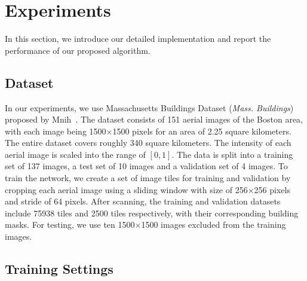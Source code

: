 
\section{Experiments}
\label{section:experiments}
In this section, we introduce our detailed implementation and report the performance of our proposed algorithm.

\subsection{Dataset}
  
In our experiments, we use Massachusetts Buildings Dataset (\textit{Mass. Buildings}) proposed by Mnih~\cite{Mnih2013Machine}.
The dataset consists of 151 aerial images of the Boston area, with each image being 1500$\times$1500 pixels for an area of 2.25 square kilometers. 
The entire dataset covers roughly 340 square kilometers. 
The intensity of each aerial image is scaled into the range of $[0,1]$.
%
The data is split into a training set of 137 images, a test set of 10 images and a validation set of 4 images. 
To train the network, we create a set of image tiles for training and validation by cropping each aerial image using a sliding window with size of 256$\times$256 pixels and stride of 64 pixels.
%
 After scanning, the training and validation datasets include 75938 tiles and 2500 tiles respectively, with their corresponding building masks. 
For testing, we use ten 1500$\times$1500 images excluded from the training images.
%  

\subsection{Training Settings}
 
